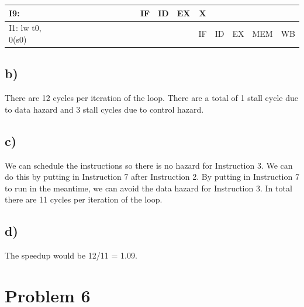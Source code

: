 \documentclass{article}
\begin{document}
\begin{table}[h]
{\begin{tabular}{|l|l|c|c|l|l|c|c|c|c|c|c|l|l|l|l|l|l|}
    I9:                                         &                         &                       &                       &                          &                          &                       &                       & \multicolumn{1}{l|}{} & \multicolumn{1}{l|}{} & IF                    & ID                    & \multicolumn{1}{c|}{EX}  & \multicolumn{1}{c|}{X}  & \multicolumn{1}{c|}{}   & \multicolumn{1}{c|}{}   &                          & \multicolumn{1}{c|}{}   \\ \hline
    I1: lw    t0, 0(s0)                         &                         & \multicolumn{1}{l|}{} &                       &                          &                          &                       &                       & \multicolumn{1}{l|}{} & \multicolumn{1}{l|}{} & \multicolumn{1}{l|}{} & \multicolumn{1}{l|}{} &                          & \multicolumn{1}{c|}{IF} & \multicolumn{1}{c|}{ID} & \multicolumn{1}{c|}{EX} & \multicolumn{1}{c|}{MEM} & \multicolumn{1}{c|}{WB} \\ \hline
    \end{tabular}%
    }
\end{table}

\subsection*{b)}

There are 12 cycles per iteration of the loop. 
There are a total of 1 stall cycle due to data hazard
and 3 stall cycles due to control hazard.
\subsection*{c)}

We can schedule the instructions so there is no hazard for Instruction 3.
We can do this by putting in Instruction 7 after Instruction 2. By putting
in Instruction 7 to run in the meantime, we can avoid the data hazard
for Instruction 3. In total there are 11 cycles per iteration of the loop.

\subsection*{d)}

The speedup would be 12/11 = 1.09.

\section*{Problem 6}
\end{document}
